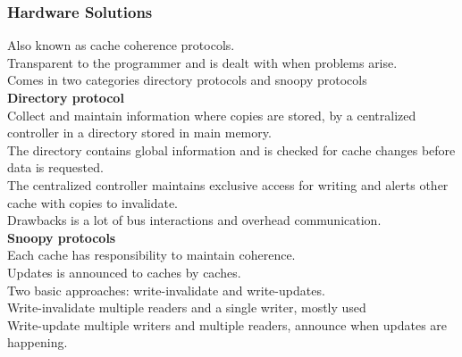 \documentclass[12pt, a4paper]{article}
\begin{document}
			\subsubsection{Hardware Solutions}
				Also known as cache coherence protocols.\\
				Transparent to the programmer and is dealt with when problems arise.\\
				Comes in two categories directory protocols and snoopy protocols\\
				\textbf{Directory protocol }\\
				Collect and maintain information where copies are stored, by a centralized controller in a directory stored in main memory.\\
				The directory contains global information and is checked for cache changes before data is requested.\\
				The centralized controller maintains exclusive access for writing and alerts other cache with copies to invalidate.\\
				Drawbacks is a lot of bus interactions and overhead communication.\\
				\textbf{Snoopy protocols}\\
				Each cache has responsibility to maintain coherence.\\
				Updates is announced to caches by caches.\\
				Two basic approaches: write-invalidate and write-updates.\\
				Write-invalidate multiple readers and a single writer, mostly used\\
				Write-update multiple writers and multiple readers, announce when updates are happening.\\
\end{document}
